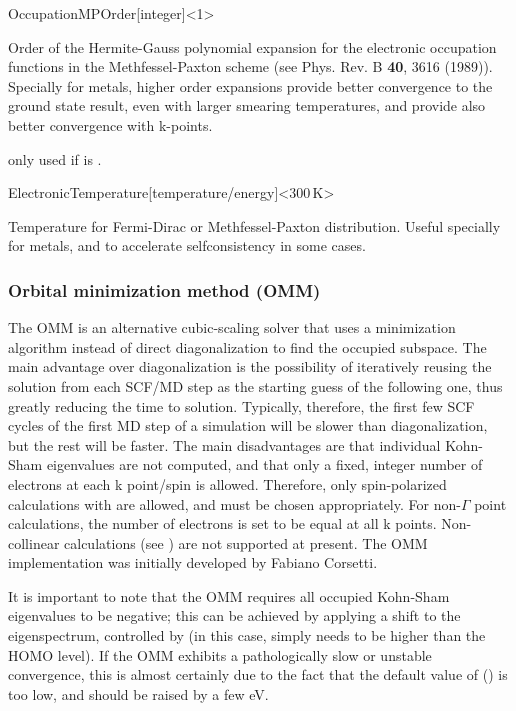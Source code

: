 \begin{fdfentry}{OccupationMPOrder}[integer]<1>
  
  Order of the Hermite-Gauss polynomial expansion for the electronic
  occupation functions in the Methfessel-Paxton scheme (see
  Phys. Rev. B \textbf{40}, 3616 (1989)).  Specially for metals,
  higher order expansions provide better convergence to the ground
  state result, even with larger smearing temperatures, and provide
  also better convergence with k-points.

  \note only used if  is .

\end{fdfentry}


\begin{fdfentry}{ElectronicTemperature}[temperature/energy]<$300\,\mathrm{K}$>
  
  Temperature for Fermi-Dirac or Methfessel-Paxton
  distribution. Useful specially for metals, and to accelerate
  selfconsistency in some cases.

\end{fdfentry}



\subsubsection{Orbital minimization method (OMM)}
\label{SolverOMM}

The OMM is an alternative cubic-scaling solver that uses a
minimization algorithm instead of direct diagonalization to find the
occupied subspace.  The main advantage over diagonalization is the
possibility of iteratively reusing the solution from each SCF/MD step
as the starting guess of the following one, thus greatly reducing the
time to solution. Typically, therefore, the first few SCF cycles of
the first MD step of a simulation will be slower than diagonalization,
but the rest will be faster. The main disadvantages are that
individual Kohn-Sham eigenvalues are not computed, and that only a
fixed, integer number of electrons at each k point/spin is
allowed. Therefore, only spin-polarized calculations with
 are allowed, and  must be chosen
appropriately. For non-$\Gamma$ point calculations, the number of
electrons is set to be equal at all k points. Non-collinear
calculations (see ) are not supported at present.
The OMM implementation was initially developed by Fabiano Corsetti.

It is important to note that the OMM requires all occupied Kohn-Sham
eigenvalues to be negative; this can be achieved by applying a shift
to the eigenspectrum, controlled by  (in this case,
 simply needs to be higher than the HOMO level). If the
OMM exhibits a pathologically slow or unstable convergence, this is
almost certainly due to the fact that the default value of
 () is too low, and should be raised by
a few eV.

